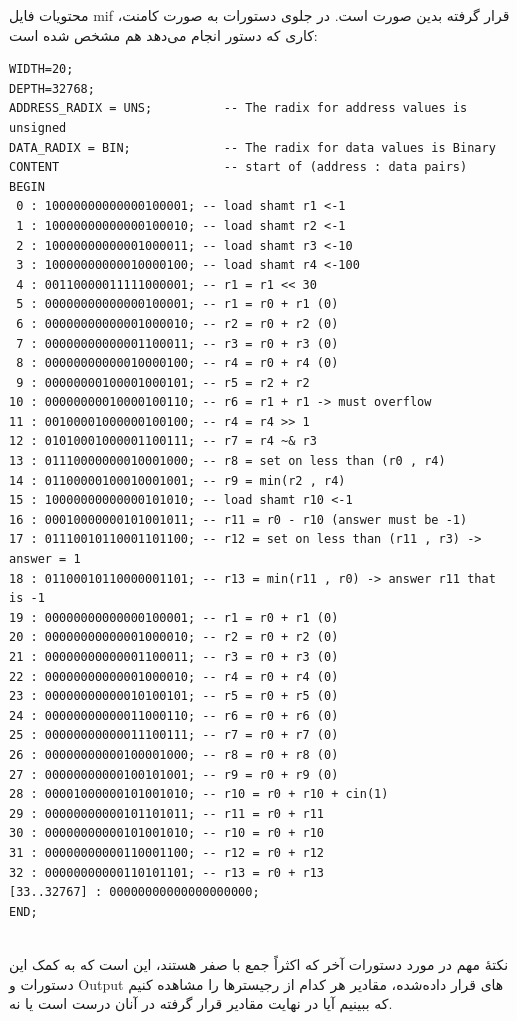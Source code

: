 \documentclass[12pt,titlepage,a4page , tikz , multi,table , svgnames,xcdraw]{article}
\begin{document}
محتویات فایل mif قرار گرفته بدین صورت است. در جلوی دستورات به صورت کامنت، کاری که دستور انجام می‌دهد هم مشخص شده است:


\begin{latin}
\begin{verbatim}
WIDTH=20;
DEPTH=32768;
ADDRESS_RADIX = UNS;          -- The radix for address values is unsigned
DATA_RADIX = BIN;             -- The radix for data values is Binary
CONTENT                       -- start of (address : data pairs)
BEGIN
 0 : 10000000000000100001; -- load shamt r1 <-1
 1 : 10000000000000100010; -- load shamt r2 <-1
 2 : 10000000000001000011; -- load shamt r3 <-10
 3 : 10000000000010000100; -- load shamt r4 <-100
 4 : 00110000011111000001; -- r1 = r1 << 30
 5 : 00000000000000100001; -- r1 = r0 + r1 (0)
 6 : 00000000000001000010; -- r2 = r0 + r2 (0)
 7 : 00000000000001100011; -- r3 = r0 + r3 (0)
 8 : 00000000000010000100; -- r4 = r0 + r4 (0)
 9 : 00000000100001000101; -- r5 = r2 + r2 
10 : 00000000010000100110; -- r6 = r1 + r1 -> must overflow
11 : 00100001000000100100; -- r4 = r4 >> 1
12 : 01010001000001100111; -- r7 = r4 ~& r3
13 : 01110000000010001000; -- r8 = set on less than (r0 , r4)
14 : 01100000100010001001; -- r9 = min(r2 , r4)
15 : 10000000000000101010; -- load shamt r10 <-1
16 : 00010000000101001011; -- r11 = r0 - r10 (answer must be -1)
17 : 01110010110001101100; -- r12 = set on less than (r11 , r3) -> answer = 1
18 : 01100010110000001101; -- r13 = min(r11 , r0) -> answer r11 that is -1
19 : 00000000000000100001; -- r1 = r0 + r1 (0)
20 : 00000000000001000010; -- r2 = r0 + r2 (0)
21 : 00000000000001100011; -- r3 = r0 + r3 (0)
22 : 00000000000001000010; -- r4 = r0 + r4 (0)
23 : 00000000000010100101; -- r5 = r0 + r5 (0)
24 : 00000000000011000110; -- r6 = r0 + r6 (0)
25 : 00000000000011100111; -- r7 = r0 + r7 (0)
26 : 00000000000100001000; -- r8 = r0 + r8 (0)
27 : 00000000000100101001; -- r9 = r0 + r9 (0)
28 : 00001000000101001010; -- r10 = r0 + r10 + cin(1)
29 : 00000000000101101011; -- r11 = r0 + r11
30 : 00000000000101001010; -- r10 = r0 + r10
31 : 00000000000110001100; -- r12 = r0 + r12
32 : 00000000000110101101; -- r13 = r0 + r13 
[33..32767] : 00000000000000000000;
END;


\end{verbatim} 
\end{latin}

نکتهٔ مهم در مورد دستورات آخر که اکثراً جمع با صفر هستند، این است که به کمک این دستورات و Output های قرار داده‌شده، مقادیر هر کدام از رجیسترها را مشاهده کنیم که ببینیم آیا در نهایت مقادیر قرار گرفته در آنان درست است یا نه.
\end{document}

